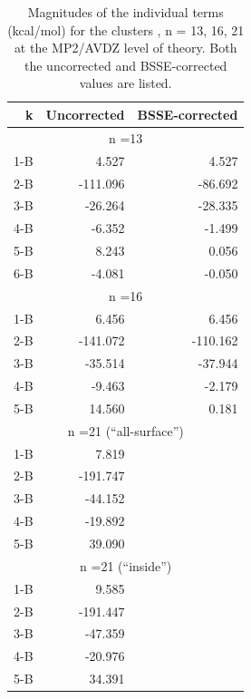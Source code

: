 \documentclass[11pt, proquest]{uwthesis}[2020/02/24]
\let\ce\ch
\begin{document}
\begin{table}[]
\centering
\begin{tabular}{@{}rrr@{}}
\toprule
k       & Uncorrected     & BSSE-corrected     \\ \midrule
\multicolumn{3}{c}{n =13}                      \\
\hline
1-B     & 4.527           & 4.527              \\
2-B     & -111.096        & -86.692            \\
3-B     & -26.264         & -28.335            \\
4-B     & -6.352          & -1.499             \\
5-B     & 8.243           & 0.056              \\
6-B     & -4.081          & -0.050             \\
\hline
\multicolumn{3}{c}{n =16}                      \\
\hline
1-B     & 6.456           & 6.456              \\
2-B     & -141.072        & -110.162           \\
3-B     & -35.514         & -37.944            \\
4-B     & -9.463          & -2.179             \\
5-B     & 14.560          & 0.181              \\
\hline
\multicolumn{3}{c}{n =21 					(“all-surface”)} \\
\hline
1-B     & 7.819           &                    \\
2-B     & -191.747        &                    \\
3-B     & -44.152         &                    \\
4-B     & -19.892         &                    \\
5-B     & 39.090          &                    \\
\hline
\multicolumn{3}{c}{n =21 (“inside”)}           \\
\hline
1-B     & 9.585           &                    \\
2-B     & -191.447        &                    \\
3-B     & -47.359         &                    \\
4-B     & -20.976         &                    \\
5-B     & 34.391          &                    \\ \bottomrule
\end{tabular}
\caption{Magnitudes of the individual terms (kcal/mol) for the clusters \ce{(H2O)n}, n = 13, 16, 21 at the MP2/AVDZ level of theory. Both the uncorrected and BSSE-corrected values are listed.}
\label{tab:MBE_I_T2}
\end{table}
\end{document}
